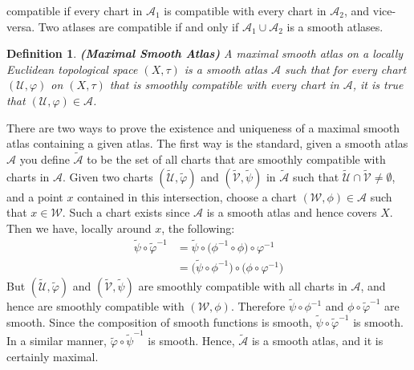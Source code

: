 \documentclass{article}
\theoremstyle{plain}
\theoremstyle{normal}
\newtheorem{definition}{Definition}[section]
\begin{document}
        compatible if every chart in $\mathcal{A}_{1}$ is compatible with
        every chart in $\mathcal{A}_{2}$, and vice-versa. Two atlases are
        compatible if and only if $\mathcal{A}_{1}\cup\mathcal{A}_{2}$ is a
        smooth atlases.
        \begin{definition}{\textbf{(Maximal Smooth Atlas)}}
            A maximal smooth atlas on a locally Euclidean topological space
            $(X,\tau)$ is a smooth atlas $\mathcal{A}$ such that for every
            chart $(\mathcal{U},\varphi)$ on $(X,\tau)$ that is smoothly
            compatible with every chart in $\mathcal{A}$, it is true that
            $(\mathcal{U},\varphi)\in\mathcal{A}$.
        \end{definition}
        There are two ways to prove the existence and uniqueness of a maximal
        smooth atlas containing a given atlas. The first way is the standard,
        given a smooth atlas $\mathcal{A}$ you define $\tilde{\mathcal{A}}$ to
        be the set of all charts that are smoothly compatible with charts in
        $\mathcal{A}$. Given two charts $(\tilde{\mathcal{U}},\tilde{\varphi})$
        and $(\tilde{\mathcal{V}},\tilde{\psi})$ in $\tilde{\mathcal{A}}$ such
        that $\tilde{\mathcal{U}}\cap\tilde{\mathcal{V}}\ne\emptyset$, and a
        point $x$ contained in this intersection, choose a
        chart $(\mathcal{W},\phi)\in\mathcal{A}$ such that $x\in\mathcal{W}$.
        Such a chart exists since $\mathcal{A}$ is a smooth atlas and hence
        covers $X$. Then we have, locally around $x$, the following:
        \begin{align}
            \tilde{\psi}\circ\tilde{\varphi}^{-1}
                &=\tilde{\psi}\circ\big(
                    \phi^{-1}\circ\phi
                \big)\circ\varphi^{-1}\\
                &=\big(\tilde{\psi}\circ\phi^{-1}\big)\circ
                    \big(\phi\circ\varphi^{-1}\big)
        \end{align}
        But $(\tilde{\mathcal{U}},\tilde{\varphi})$ and
        $(\tilde{\mathcal{V}},\tilde{\psi})$ are smoothly compatible with all
        charts in $\mathcal{A}$, and hence are smoothly compatible with
        $(\mathcal{W},\phi)$. Therefore
        $\tilde{\psi}\circ\phi^{-1}$ and $\phi\circ\tilde{\varphi}^{-1}$ are
        smooth. Since the composition of smooth functions is smooth,
        $\tilde{\psi}\circ\tilde{\varphi}^{-1}$ is smooth. In a similar manner,
        $\tilde{\varphi}\circ\tilde{\psi}^{-1}$ is smooth. Hence,
        $\tilde{\mathcal{A}}$ is a smooth atlas, and it is certainly maximal.
\end{document}
